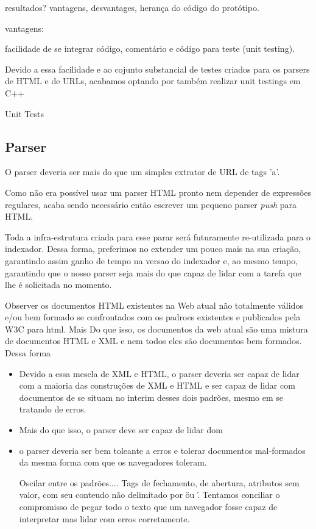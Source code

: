 \documentclass[10pt,twocolumn]{article}
\begin{document}
resultados? vantagens, desvantages, herança do código do protótipo.

vantagens:

facilidade de se integrar código, comentário e código para teste (unit testing).

Devido a essa facilidade e ao cojunto substancial de testes criados para os
parsers de HTML e de URLs, acabamos optando por também realizar unit testings
em C++

Unit Tests

\subsection{Parser}

O parser deveria ser mais do que um simples extrator de URL de tags 'a'.

Como não era possível usar um parser HTML pronto nem depender de expressões
regulares, acaba sendo necessário então escrever um pequeno parser \emph{push}
para HTML.

Toda a infra-estrutura criada para esse parar será futuramente re-utilizada
para o indexador. Dessa forma, preferimos no extender um pouco mais na sua
criação, garantindo assim ganho de tempo na versao do indexador e, ao mesmo
tempo, garantindo que o nosso parser seja mais do que capaz de lidar com a
tarefa que lhe é solicitada no momento.

Observer os documentos HTML existentes na Web atual não totalmente válidos e/ou
bem formado se confrontados com os padroes existentes e publicados pela W3C
para html. Mais Do que isso, os documentos da web atual são uma mistura de
documentos HTML e XML e nem todos eles são documentos bem formados. Dessa forma

\begin{itemize}

\item Devido a essa mescla de XML e HTML, o parser deveria ser capaz de lidar
com a maioria das construções de XML e HTML e ser capaz de lidar com documentos
de se situam no interim desses dois padrões, mesmo em se tratando de erros.

\item Mais do que isso, o parser deve ser capaz de lidar dom

\item o parser deveria ser bem toleante a erros e tolerar documentos
mal-formados da mesma forma com que os navegadores toleram. 

Oscilar entre os padrões.... Tags de fechamento, de abertura, atributos sem
valor, com seu conteudo não delimitado por \" ou \'. Tentamos conciliar o
compromisso de pegar todo o texto que um navegador fosse capaz de interpretar
mas lidar com erros corretamente.

\end{itemize}
\end{document}
